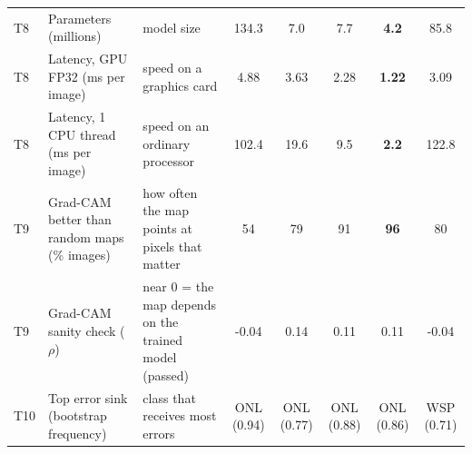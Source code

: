 \begin{table}[!htbp]
\begin{tabular}{>{\raggedright\arraybackslash}p{0.6cm}>{\raggedright\arraybackslash}p{4.0cm}>{\raggedright\arraybackslash}p{4.6cm}ccccc}
T8 & Parameters (millions) & model size & 134.3 & 7.0 & 7.7 & \textbf{4.2} & 85.8 \\
T8 & Latency, GPU FP32 (ms per image) & speed on a graphics card & 4.88 & 3.63 & 2.28 & \textbf{1.22} & 3.09 \\
T8 & Latency, 1 CPU thread (ms per image) & speed on an ordinary processor & 102.4 & 19.6 & 9.5 & \textbf{2.2} & 122.8 \\
T9 & Grad-CAM better than random maps (\% images) & how often the map points at pixels that matter & 54 & 79 & 91 & \textbf{96} & 80 \\
T9 & Grad-CAM sanity check ($\rho$) & near 0 = the map depends on the trained model (passed) & -0.04 & 0.14 & 0.11 & 0.11 & -0.04 \\
T10 & Top error sink (bootstrap frequency) & class that receives most errors & ONL (0.94) & ONL (0.77) & ONL (0.88) & ONL (0.86) & WSP (0.71) \\
\hline
\end{tabular}
\end{table}
